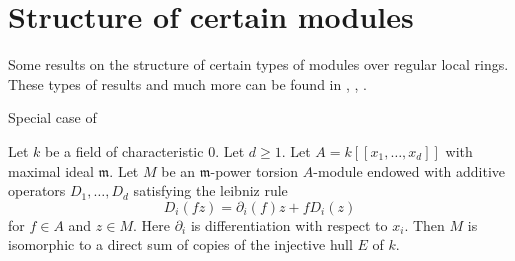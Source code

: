 \section{Structure of certain modules}
\label{section-structure}

\noindent
Some results on the structure of certain types of
modules over regular local rings. These types of
results and much more can be found in
\cite{Huneke-Sharp}, \cite{Lyubeznik}, \cite{Lyubeznik2}.

\begin{lemma}
\label{lemma-structure-torsion-D-module-regular}
\begin{reference}
Special case of \cite[Theorem 2.4]{Lyubeznik}
\end{reference}
Let $k$ be a field of characteristic $0$. Let $d \geq 1$.
Let $A = k[[x_1, \ldots, x_d]]$ with maximal ideal $\mathfrak m$.
Let $M$ be an $\mathfrak m$-power torsion $A$-module endowed with
additive operators $D_1, \ldots, D_d$ satisfying the leibniz rule
$$
D_i(fz) = \partial_i(f) z + f D_i(z)
$$
for $f \in A$ and $z \in M$. Here $\partial_i$ is
differentiation with respect to $x_i$.
Then $M$ is isomorphic to a direct sum
of copies of the injective hull $E$ of $k$.
\end{lemma}

